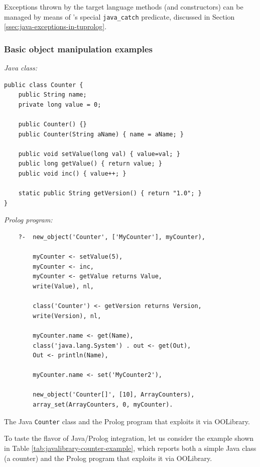 \noindent Exceptions thrown by the target language methods (and constructors) can be managed by means of \tuprolog{}'s special \texttt{java\_catch} %
predicate, discussed in Section \ref{ssec:java-exceptions-in-tuprolog}.

\subsubsection{Basic object manipulation examples}

\begin{table}
\textit{Java class:}
\begin{verbatim}
public class Counter {
    public String name;
    private long value = 0;

    public Counter() {}
    public Counter(String aName) { name = aName; }

    public void setValue(long val) { value=val; }
    public long getValue() { return value; }
    public void inc() { value++; }

    static public String getVersion() { return "1.0"; }
}
\end{verbatim}

\textit{Prolog program:}
\begin{verbatim}
    ?-  new_object('Counter', ['MyCounter'], myCounter),

        myCounter <- setValue(5),
        myCounter <- inc,
        myCounter <- getValue returns Value,
        write(Value), nl,

        class('Counter') <- getVersion returns Version,
        write(Version), nl,

        myCounter.name <- get(Name),
        class('java.lang.System') . out <- get(Out),
        Out <- println(Name),

        myCounter.name <- set('MyCounter2'),

        new_object('Counter[]', [10], ArrayCounters),
        array_set(ArrayCounters, 0, myCounter).
\end{verbatim}
\caption{The Java \texttt{Counter} class and the Prolog program that exploits it via OOLibrary.}
\label{tab:javalibrary-counter-example}
\end{table}

To taste the flavor of \tuprolog{} Java/Prolog integration, let us consider the example shown in Table \ref{tab:javalibrary-counter-example}, which reports both a simple Java class (a counter) and the Prolog program that exploits it via OOLibrary.

